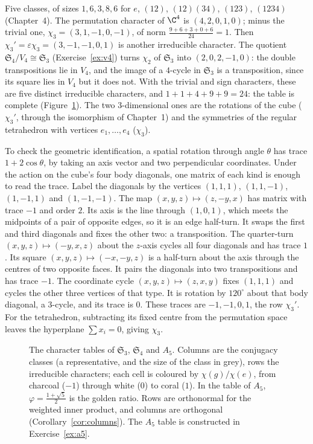 \begin{example}[$\mathfrak S_4$]\label{ex:s4}
Five classes, of sizes $1,6,3,8,6$ for $e$, $(12)$, $(12)(34)$, $(123)$, $(1234)$ (Chapter~4). The permutation character of $\C^4$ is $(4,2,0,1,0)$; minus the trivial one, $\chi_3=(3,1,-1,0,-1)$, of norm $\frac{9+6+3+0+6}{24}=1$. Then $\chi_3'=\varepsilon\chi_3=(3,-1,-1,0,1)$ is another irreducible character. The quotient $\mathfrak S_4/V_4\cong\mathfrak S_3$ (Exercise~\ref{ex:v4}) turns $\chi_2$ of $\mathfrak S_3$ into $(2,0,2,-1,0)$: the double transpositions lie in $V_4$, and the image of a $4$-cycle in $\mathfrak S_3$ is a transposition, since its square lies in $V_4$ but it does not. With the trivial and sign characters, these are five distinct irreducible characters, and $1+1+4+9+9=24$: the table is complete (Figure~\ref{fig:tables}). The two $3$-dimensional ones are the rotations of the cube ($\chi_3'$, through the isomorphism of Chapter~1) and the symmetries of the regular tetrahedron with vertices $e_1,\dots,e_4$ ($\chi_3$).

To check the geometric identification, a spatial rotation through angle $\theta$
has trace $1+2\cos\theta$, by taking an axis vector and two perpendicular
coordinates. Under the action on the cube's four body diagonals, one matrix of each kind is enough to read the trace. Label the diagonals by the vertices $(1,1,1)$, $(1,1,-1)$, $(1,-1,1)$ and $(1,-1,-1)$. The map $(x,y,z)\mapsto(z,-y,x)$ has matrix with trace $-1$ and order $2$. Its axis is the line through $(1,0,1)$, which meets the midpoints of a pair of opposite edges, so it is an edge half-turn. It swaps the first and third diagonals and fixes the other two: a transposition. The quarter-turn $(x,y,z)\mapsto(-y,x,z)$ about the $z$-axis cycles all four diagonals and has trace $1$. Its square $(x,y,z)\mapsto(-x,-y,z)$ is a half-turn about the axis through the centres of two opposite faces. It pairs the diagonals into two transpositions and has trace $-1$. The coordinate cycle $(x,y,z)\mapsto(z,x,y)$ fixes $(1,1,1)$ and cycles the other three vertices of that type. It is rotation by $120^\circ$ about that body diagonal, a $3$-cycle, and its trace is $0$. These traces are $-1,-1,0,1$, the row $\chi_3'$.
For the tetrahedron, subtracting its fixed centre from the permutation space
leaves the hyperplane $\sum x_i=0$, giving $\chi_3$.
\end{example}

\begin{figure}[ht]
\centering
{}
\caption{The character tables of $\mathfrak S_3$, $\mathfrak S_4$ and $A_5$. Columns are the conjugacy classes (a representative, and the size of the class in grey), rows the irreducible characters; each cell is coloured by $\chi(g)/\chi(e)$, from charcoal ($-1$) through white ($0$) to coral ($1$). In the table of $A_5$, $\varphi=\frac{1+\sqrt5}2$ is the golden ratio. Rows are orthonormal for the weighted inner product, and columns are orthogonal (Corollary~\ref{cor:columns}). The $A_5$ table is constructed in Exercise~\ref{ex:a5}.}
\label{fig:tables}
\end{figure}

